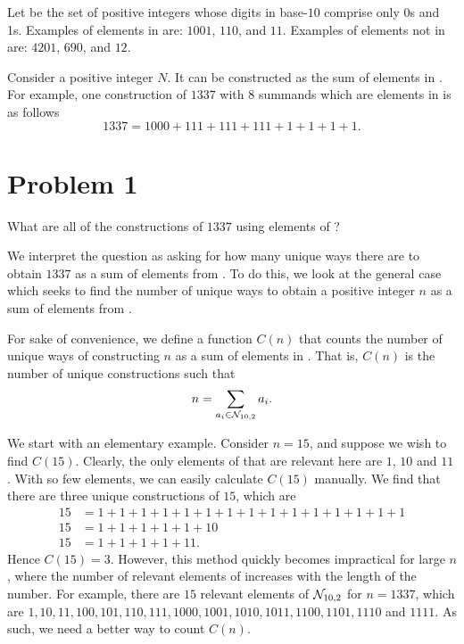 
Let \NTen{} be the set of positive integers whose digits in base-$10$ comprise only 0s and 1s. Examples of elements in \NTen{} are: $1001$, $110$, and $11$. Examples of elements not in \NTen{} are: $4201$, $690$, and $12$.

Consider a positive integer $N$. It can be constructed as the sum of elements in \NTen{}. For example, one construction of $1337$ with $8$ summands which are elements in \NTen{} is as follows
\[
  1337 = 1000 + 111 + 111 + 111 + 1 + 1 + 1 + 1
.\] 

\section{Problem 1}
\begin{problem}
  What are all of the constructions of $1337$ using elements of \NTen{}?
\end{problem}
We interpret the question as asking for how many unique ways there are to obtain $1337$ as a sum of elements from \NTen{}. To do this, we look at the general case which seeks to find the number of unique ways to obtain a positive integer  $n$ as a sum of elements from \NTen{}.
\begin{definition}
  For sake of convenience, we define a function $C(n)$ that counts the number of unique ways of constructing $n$ as a sum of elements in \NTen{}. That is, $C(n)$ is the number of unique constructions such that \[
    n = \sum_{a_i \in \mathcal{N}_{10, 2}} a_i
  .\] 
\end{definition}
We start with an elementary example. Consider $n = 15$, and suppose we wish to find $C(15)$. Clearly, the only elements of \NTen{} that are relevant here are $1$, $10$ and $11$. With so few elements, we can easily calculate $C(15)$ manually. We find that there are three unique constructions of $15$, which are 
\begin{align*}
  15 &= 1 + 1 + 1 + 1 + 1 + 1 + 1 + 1 + 1 + 1 + 1 + 1 + 1 + 1 + 1 \\
  15 &= 1 + 1 + 1 + 1 + 1 + 10 \\
  15 &= 1 + 1 + 1 + 1 + 11.
\end{align*}
Hence $C(15) = 3$. However, this method quickly becomes impractical for large $n$, where the number of relevant elements of \NTen{} increases with the length of the number. For example, there are $15$ relevant elements of $\mathcal{N}_{10, 2}$ for $n = 1337$, which are $1, 10, 11, 100, 101, 110, 111, 1000, 1001, 1010, 1011, 1100, 1101, 1110$ and $1111$. As such, we need a better way to count $C(n)$.

